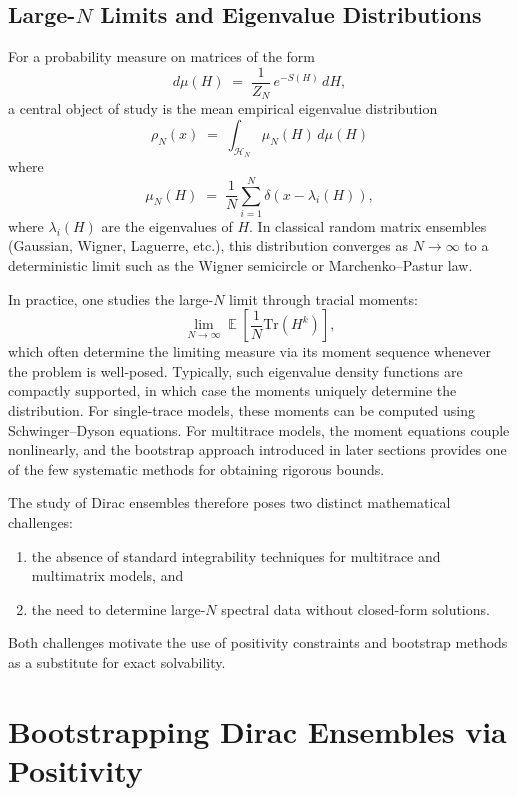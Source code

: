 \documentclass[11pt]{article}
\theoremstyle{plain}
\DeclareMathOperator{\ex}{\mathbb{E}}
\begin{document}
\subsection{Large-\texorpdfstring{$N$}{N} Limits and Eigenvalue Distributions}

For a probability measure on matrices of the form
\[
d\mu(H) \;=\; \frac{1}{Z_N}\, e^{-S(H)}\, dH,
\]
a central object of study is the mean empirical eigenvalue distribution
\[
\rho_N(x)
  \;=\;
  \int_{\mathcal{H}_N}
    \mu_N(H)\, d\mu(H)\]
where
\[\mu_N(H) \;=\; \frac{1}{N}\sum_{i=1}^N \delta(x - \lambda_i(H)),
\]
where $\lambda_i(H)$ are the eigenvalues of $H$. In classical random matrix ensembles (Gaussian, Wigner,
Laguerre, etc.), this distribution converges as $N\to\infty$ to a deterministic limit such as the
Wigner semicircle or Marchenko–Pastur law. 


In practice, one studies  the large-\(N\) limit through tracial moments:
\[
\lim_{N\to\infty}
\ex \left[\frac{1}{N}\mathrm{Tr}(H^k) \right],
\]
which often determine the limiting measure via its moment sequence whenever the problem is well-posed. Typically, such eigenvalue density functions are compactly supported, in which case the moments uniquely determine the distribution. For single-trace models, these moments can be computed using Schwinger–Dyson equations. For multitrace models, the moment equations couple nonlinearly, and the bootstrap
approach introduced in later sections provides one of the few systematic methods for obtaining
rigorous bounds.

The study of Dirac ensembles therefore poses two distinct mathematical challenges:
\begin{enumerate}
\item the absence of standard integrability techniques for multitrace and multimatrix models, and
\item the need to determine large-\(N\) spectral data without closed-form solutions.
\end{enumerate}
Both challenges motivate the use of positivity constraints and bootstrap methods as a substitute for
exact solvability.

\section{Bootstrapping Dirac Ensembles via Positivity}
\label{sec:bootstrap-dirac}
\end{document}
